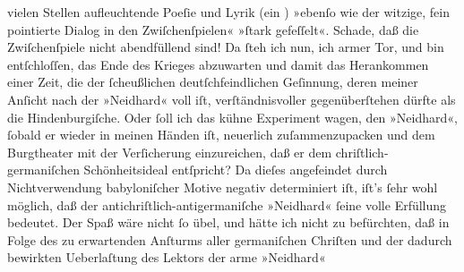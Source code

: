\begin{ledgroupsized}[t]{13cm}
               vielen Stellen aufleuchtende Poeſie und Lyrik (ein \label{K_L02260-1v}\label{K_L02260-1h}) »ebenſo wie der witzige, fein pointierte Dialog in den
               Zwiſchenſpielen« »ſtark gefeſſelt«. Schade, daß die Zwiſchenſpiele nicht abendfüllend
               sind!\pend
           \pstart
           Da ſteh ich nun, ich armer
               Tor, und bin entſchloſſen, das Ende des Krieges abzuwarten und damit das
               Herankommen einer Zeit, die der ſcheußlichen deutſchfeindlichen Geſinnung, deren
               meiner Anſicht nach der »Neidhard« voll iſt,
               verſtändnisvoller gegenüberſtehen dürfte als die Hindenburgiſche. Oder ſoll ich das kühne Experiment wagen, den »Neidhard«, ſobald er wieder in meinen Händen iſt,
               neuerlich zuſammenzupacken und dem Burgtheater mit
               der Verſicherung einzureichen, daß er dem chriſtlich-germaniſchen Schönheitsideal
               entſpricht? Da dieſes angefeindet {\pb}durch
               Nichtverwendung babyloniſcher Motive negativ
               determiniert iſt, iſt’s ſehr wohl möglich, daß der antichriſtlich-antigermaniſche
                  »Neidhard« ſeine volle Erfüllung bedeutet.
               Der Spaß wäre nicht ſo übel, und hätte ich nicht zu befürchten, daß in Folge des zu
               erwartenden Anſturms aller germaniſchen Chriſten und der dadurch bewirkten
               Ueberlaſtung des Lektors der arme »Neidhard«

\end{ledgroupsized}

